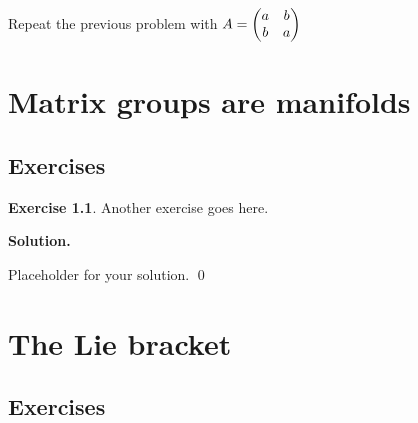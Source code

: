 \documentclass[12pt]{book}
\theoremstyle{definition}
\newtheorem{exercise}{Exercise}[chapter]
\newenvironment{solution}
{%
  \par\noindent\textbf{Solution.}\quad
}
{%
  \qed\par
}
\begin{document}
\begin{taggedexercise}[TODO]
  Repeat the previous problem with $A = \begin{pmatrix} a & b \\ b & a \end{pmatrix}$
\end{taggedexercise}

\begin{taggedexercise}[TODO]
  
\end{taggedexercise}

\begin{taggedexercise}[TODO]
  
\end{taggedexercise}

\begin{taggedexercise}[TODO]
  
\end{taggedexercise}

\begin{taggedexercise}[TODO]
  
\end{taggedexercise}

\chapter{Matrix groups are manifolds}
\section{Exercises}

\begin{exercise}
Another exercise goes here.
\end{exercise}

\begin{solution}
Placeholder for your solution.
\end{solution}

\chapter{The Lie bracket}
\section{Exercises}
\end{document}
